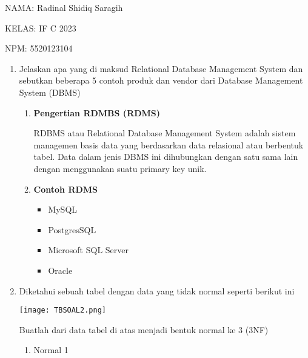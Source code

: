 \documentclass[12pt,a4paper]{article}
\date{}
\begin{document}
    NAMA: Radinal Shidiq Saragih

    KELAS: IF C 2023 

    NPM: 5520123104

    \begin{enumerate}

      \item Jelaskan apa yang di maksud Relational Database Management 
        System dan sebutkan beberapa 5 contoh produk dan vendor dari
        Database Management System (DBMS)

        \begin{enumerate}

          \item \textbf{Pengertian RDMBS (RDMS)}

            RDBMS atau Relational Database Management
            System adalah sistem managemen basis data yang
            berdasarkan data relasional atau berbentuk tabel.
            Data dalam jenis DBMS ini dihubungkan dengan satu
            sama lain dengan menggunakan suatu primary key
            unik.

          \item \textbf{Contoh RDMS}

            \begin{itemize}

              \item MySQL
              \item PostgresSQL
              \item Microsoft SQL Server
              \item Oracle

            \end{itemize}


        \end{enumerate}

      \item Diketahui sebuah tabel dengan data yang tidak normal seperti berikut ini

        \begin{center}
          \texttt{[image: TBSOAL2.png]}
        \end{center}

        Buatlah dari data tabel di atas menjadi bentuk normal ke 3 (3NF)

        \begin{enumerate}

          \item Normal 1


\end{enumerate}
\end{enumerate}
\end{document}
